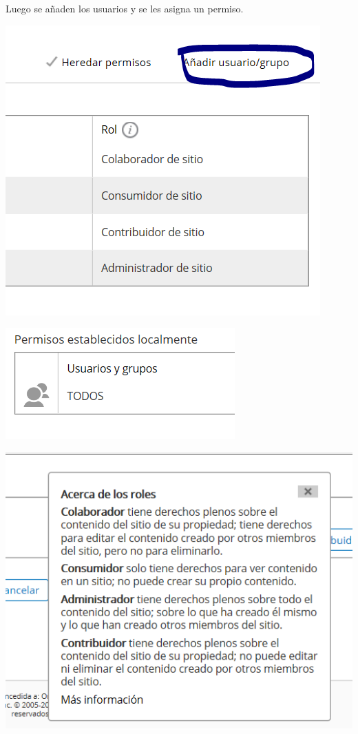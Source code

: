 \documentclass{article}
\begin{document}
Luego se añaden los usuarios y se les asigna un permiso.

\begin{center}
\includegraphics[scale=0.5]{images/permisos.png}
\end{center}

\begin{center}
\includegraphics[scale=0.5]{images/permisos2.png}
\end{center}

\begin{center}
\includegraphics[scale=0.5]{images/info.png}
\end{center}
\end{document}
